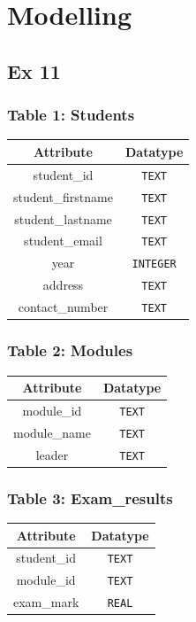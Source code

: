 \section{Modelling}


\subsection*{Ex 11}

\subsubsection*{Table 1: Students}
\begin{tabular}{|c|c|}
\hline
\textbf{Attribute} & \textbf{Datatype} \\ \hline
student_id & \verb|TEXT| \\ 
\hline
student_firstname & \verb|TEXT| \\ 
\hline
student_lastname & \verb|TEXT| \\ 
\hline
student_email & \verb|TEXT| \\ 
\hline
year & \verb|INTEGER| \\ 
\hline
address & \verb|TEXT| \\ 
\hline
contact_number & \verb|TEXT| \\
\hline
\end{tabular}

\subsubsection*{Table 2: Modules}
\begin{tabular}{|c|c|}
\hline
\textbf{Attribute} & \textbf{Datatype} \\ \hline
module_id & \verb|TEXT| \\ 
\hline
module_name & \verb|TEXT| \\ 
\hline
leader & \verb|TEXT| \\ 
\hline
\end{tabular}

\subsubsection*{Table 3: Exam_results}
\begin{tabular}{|c|c|}
\hline
\textbf{Attribute} & \textbf{Datatype} \\ \hline
student_id & \verb|TEXT| \\ 
\hline
module_id & \verb|TEXT| \\ 
\hline
exam_mark & \verb|REAL| \\ 
\hline
\end{tabular}

